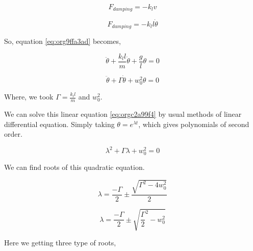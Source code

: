 \documentclass[11pt,a4paper]{article}
\begin{document}
\begin{equation*}
\label{eq:orge7bf037}
F_{damping}=-k_{l}v
\end{equation*}

\begin{equation*}
\label{eq:orga31bb06}
F_{damping}=-k_{l}l\dot{\theta}
\end{equation*}

So, equation \ref{eq:org9ffa3ad} becomes,

\begin{equation}
\label{eq:org832e462}
\ddot{\theta}+\frac{k_{l}l}{m}\dot{\theta}+\frac{g}{l}\theta=0
\end{equation}

\begin{equation}
\label{eq:orgc2a99f4}
\ddot{\theta}+\Gamma\dot{\theta}+w_{0}^{2}\theta=0
\end{equation}

Where, we took \(\Gamma = \frac{k_{l}l}{m}\) and \(w_{0}^{2}\).

We can solve this linear equation \ref{eq:orgc2a99f4} by usual methods of linear differential equation. Simply taking \(\theta=e^{\lambda t}\), which gives polynomials of second order.

\begin{equation}
\label{eq:org8455fc8}
\lambda^{2}+\Gamma\lambda+w_{0}^{2}=0
\end{equation}

We can find roots of this quadratic equation.

\begin{equation}
\label{eq:org11ba213}
\lambda = \frac{-\Gamma}{2} \pm \frac{\sqrt{\Gamma^{2}-4w_{0}^{2}}}{2}
\end{equation}

\begin{equation}
\label{eq:orgf108521}
\lambda = \frac{-\Gamma}{2} \pm \sqrt{\frac{\Gamma}{2}^{2}-w_{0}^{2}}
\end{equation}

Here we getting three type of roots,
\end{document}
